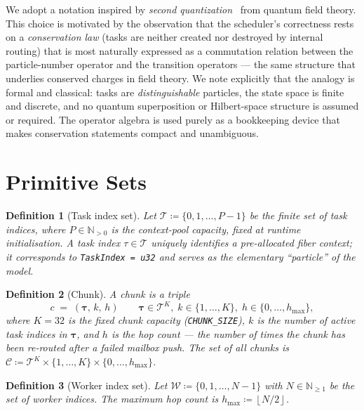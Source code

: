 \documentclass[11pt,a4paper]{article}
\newtheorem{definition}{Definition}[section]
\newcommand{\floor}[1]{\left\lfloor #1 \right\rfloor}
\newcommand{\code}[1]{\texttt{#1}}
\begin{document}
We adopt a notation inspired by \emph{second quantization}~\cite{dirac1927,jordan_wigner1928,fock1932,landau_qm,landau_fields,landau_statphys,feynman_ii,feynman_iii,derrida2007,schutz2001} from
quantum field theory.  This choice is motivated by the observation
that the scheduler's correctness rests on a \emph{conservation law}
(tasks are neither created nor destroyed by internal routing) that is
most naturally expressed as a commutation relation between the
particle-number operator and the transition operators --- the same
structure that underlies conserved charges in field theory.  We note
explicitly that the analogy is formal and classical: tasks are
\emph{distinguishable} particles, the state space is finite and
discrete, and no quantum superposition or Hilbert-space structure is
assumed or required.  The operator algebra is used purely as a
bookkeeping device that makes conservation statements compact and
unambiguous.

\section{Primitive Sets}

\begin{definition}[Task index set]
\label{def:taskset}
Let $\mathcal{T} \coloneqq \{0, 1, \ldots, P-1\}$ be the finite set
of \emph{task indices}, where $P \in \mathbb{N}_{>0}$ is the
context-pool capacity, fixed at runtime initialisation.  A task index
$\tau \in \mathcal{T}$ uniquely identifies a pre-allocated fiber
context; it corresponds to \code{TaskIndex = u32} and serves as the
elementary ``particle'' of the model.
\end{definition}

\begin{definition}[Chunk]
\label{def:chunk}
A \emph{chunk} is a triple
\[
  c \;=\; (\bm{\tau},\, k,\, h)
  \qquad
  \bm{\tau} \in \mathcal{T}^{K},\;
  k \in \{1,\ldots,K\},\;
  h \in \{0,\ldots,h_{\max}\},
\]
where $K = 32$ is the fixed chunk capacity (\code{CHUNK\_SIZE}),
$k$ is the number of active task indices in $\bm{\tau}$, and $h$ is
the \emph{hop count} --- the number of times the chunk has been
re-routed after a failed mailbox push.  The set of all chunks is
$\mathcal{C} \coloneqq \mathcal{T}^K \times \{1,\ldots,K\} \times
\{0,\ldots,h_{\max}\}$.
\end{definition}

\begin{definition}[Worker index set]
\label{def:workers}
Let $\mathcal{W} \coloneqq \{0, 1, \ldots, N-1\}$ with
$N \in \mathbb{N}_{\geq 1}$ be the set of \emph{worker indices}.
The maximum hop count is $h_{\max} \coloneqq \floor{N/2}$.
\end{definition}
\end{document}
